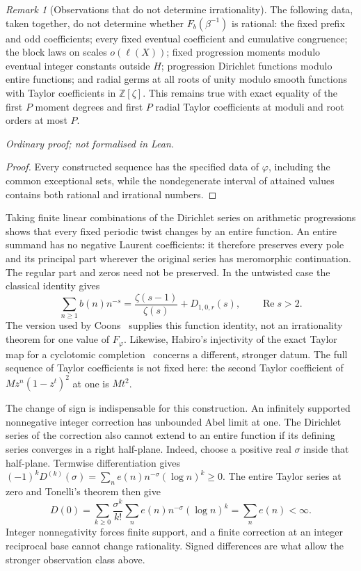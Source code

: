 \documentclass[11pt]{article}
\theoremstyle{plain}
\theoremstyle{definition}
\theoremstyle{remark}
\newtheorem{rem}[thm]{Remark}
\newcommand{\Z}{\mathbb{Z}}
\begin{document}
\begin{rem}[Observations that do not determine irrationality]
\label{long249:cor:signed-observations}
The following data, taken together, do not determine whether
$F_b(\beta^{-1})$ is rational: the fixed prefix and odd coefficients;
every fixed eventual coefficient and cumulative congruence; the block
laws on scales $o(\ell(X))$; fixed progression moments modulo eventual
integer constants outside $H$; progression Dirichlet functions modulo
entire functions; and radial germs at all roots of unity modulo smooth
functions with Taylor coefficients in $\Z[\zeta]$. This remains true
with exact equality of the first $P$ moment degrees and first $P$
radial Taylor coefficients at moduli and root orders at most $P$.
\end{rem}
\noindent\emph{Ordinary proof; not formalised in Lean.}


\begin{proof}
Every constructed sequence has the specified data of $\varphi$, including
the common exceptional sets, while the nondegenerate interval of attained
values contains both rational and irrational numbers.
\end{proof}

Taking finite linear combinations of the Dirichlet series on arithmetic
progressions shows that every fixed periodic twist changes by an entire
function. An entire summand has no negative Laurent coefficients: it
therefore preserves every pole and its principal part wherever the
original series has meromorphic continuation. The regular part and
zeros need not be preserved. In the untwisted case the classical identity
gives
\[
 \sum_{n\ge1}b(n)n^{-s}=\frac{\zeta(s-1)}{\zeta(s)}+D_{1,0,r}(s),
 \qquad\operatorname{Re}s>2.
\]
The version used by Coons~\cite[Theorem~3.3]{coons-arxiv-signed} supplies
this function identity, not an irrationality theorem for one value of
$F_\varphi$. Likewise, Habiro's injectivity of the exact Taylor map for
a cyclotomic completion~\cite[Theorem~5.2]{habiro2004signed} concerns a
different, stronger datum. The full sequence of Taylor coefficients is not fixed here:
the second Taylor coefficient of $Mz^n(1-z^t)^2$ at one is $Mt^2$.

The change of sign is indispensable for this construction. An infinitely
supported nonnegative integer correction has unbounded Abel limit at one.
The Dirichlet series of the correction also cannot extend to an
entire function if its defining series converges in a right half-plane. Indeed, choose a positive real
$\sigma$ inside that half-plane. Termwise differentiation gives
$(-1)^kD^{(k)}(\sigma)=\sum_ne(n)n^{-\sigma}(\log n)^k\ge0$.
The entire Taylor series at zero and Tonelli's theorem then give
\[
 D(0)=\sum_{k\ge0}\frac{\sigma^k}{k!}
       \sum_ne(n)n^{-\sigma}(\log n)^k=\sum_ne(n)<\infty.
\]
Integer nonnegativity forces finite support, and a finite correction at
an integer reciprocal base cannot change rationality. Signed differences
are what allow the stronger observation class above.
\end{document}
